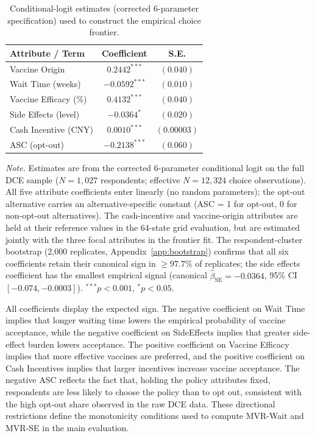 \documentclass[11pt]{article}
\begin{document}
\begin{table}[h]
\centering
\caption{Conditional-logit estimates (corrected 6-parameter specification) used to construct the empirical choice frontier.}
\label{tab:static_frontier_estimates}
\small
\setlength{\tabcolsep}{8pt}
\begin{tabular}{l c c}
\toprule
\textbf{Attribute / Term} & \textbf{Coefficient} & \textbf{S.E.} \\
\midrule
Vaccine Origin & $0.2442^{***}$ & $(0.040)$ \\
Wait Time (weeks) & $-0.0592^{***}$ & $(0.010)$ \\
Vaccine Efficacy (\%) & $0.4132^{***}$ & $(0.040)$ \\
Side Effects (level) & $-0.0364^{*}$ & $(0.020)$ \\
Cash Incentive (CNY) & $0.0010^{***}$ & $(0.00003)$ \\
ASC (opt-out) & $-0.2138^{***}$ & $(0.060)$ \\
\bottomrule
\end{tabular}

\vspace{0.4em}
\begin{minipage}{0.95\textwidth}
\small
\textit{Note.} Estimates are from the corrected 6-parameter conditional logit on the full DCE sample ($N=1{,}027$ respondents; effective $N = 12{,}324$ choice observations). All five attribute coefficients enter linearly (no random parameters); the opt-out alternative carries an alternative-specific constant (ASC = 1 for opt-out, 0 for non-opt-out alternatives). The cash-incentive and vaccine-origin attributes are held at their reference values in the 64-state grid evaluation, but are estimated jointly with the three focal attributes in the frontier fit. The respondent-cluster bootstrap (2{,}000 replicates, Appendix~\ref{app:bootstrap}) confirms that all six coefficients retain their canonical sign in $\geq 97.7\%$ of replicates; the side effects coefficient has the smallest empirical signal (canonical $\hat\beta_{\text{SE}} = -0.0364$, 95\% CI $[-0.074, -0.0003]$). $^{***}p < 0.001$, $^{*}p < 0.05$.
\end{minipage}
\end{table}

All coefficients display the expected sign. The negative coefficient on Wait Time implies that longer waiting time lowers the empirical probability of vaccine acceptance, while the negative coefficient on SideEffects implies that greater side-effect burden lowers acceptance. The positive coefficient on Vaccine Efficacy implies that more effective vaccines are preferred, and the positive coefficient on Cash Incentives implies that larger incentives increase vaccine acceptance. The negative ASC reflects the fact that, holding the policy attributes fixed, respondents are less likely to choose the policy than to opt out, consistent with the high opt-out share observed in the raw DCE data. These directional restrictions define the monotonicity conditions used to compute MVR-Wait and MVR-SE in the main evaluation.
\end{document}
